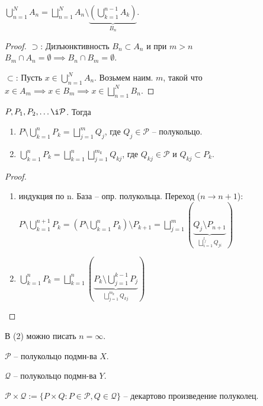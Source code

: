 \begin{lemma}
    $\bigcup_{n=1}^{N} A_n = \bigsqcup_{n=1}^{N}A_n \setminus \underbrace{\left(\bigcup_{k=1}^{n-1}A_k\right)}_{B_n}$.
\end{lemma}
\begin{proof}
    $\supset$: Дизъюнктивность $B_n \subset A_n $ и при $m > n$ $B_m \cap A_n = \emptyset \implies B_n \cap B_m = \emptyset$.
    
    $\subset$: Пусть $x \in \bigcup_{n=1}^{N} A_n$. Возьмем наим. $m$, такой что $x \in A_m \implies x \in B_m \implies x \in \bigsqcup_{n=1}^{N} B_n$.
\end{proof}

\begin{theorem}
    $P, P_1, P_2, \dots \i \mathcal{P}$. Тогда 

    \begin{enumerate}
        \item $P \setminus \bigcup_{k=1}^{n} P_k = \bigsqcup_{j=1}^m Q_j$, где $Q_j \in \mathcal{P}$ -- полукольцо.
        \item $\bigcup_{k=1}^{n} P_k = \bigsqcup_{k=1}^{n} \bigsqcup_{j=1}^{m_k} Q_{kj}$, где $Q_{kj} \in \mathcal{P}$ и $Q_{kj} \subset P_k$. 
    \end{enumerate}
\end{theorem}

\begin{proof}
    \begin{enumerate}
        \item индукция по n. База -- опр. полукольца. Переход ($n \rightarrow n+1$): $P \setminus \bigcup_{k=1}^{n+1}P_k = \left(P \setminus \bigcup_{k=1}^nP_k\right) \setminus P_{k+1} = \bigsqcup_{j=1}^{m} \left(\underbrace{Q_j \setminus P_{n+1}}_{\bigsqcup_{i=1}^{l_j}Q_{ji}}\right)$
        \item $\bigcup_{k=1}^{n} P_k = \bigsqcup_{k=1}^{n} \left(\underbrace{P_k \setminus \bigcup_{j=1}^{k-1} P_j}_{\bigsqcup_{j=1}^{m_k} Q_{kj}}\right)$
    \end{enumerate}
\end{proof}

\begin{remark}
    В (2) можно писать $n = \infty$.
\end{remark}

\begin{definition}
    $\mathcal{P}$ -- полукольцо подмн-ва $X$.

    $\mathcal{Q}$ -- полукольцо подмн-ва $Y$.

    $\mathcal{P} \times \mathcal{Q} := \{P \times Q : P \in \mathcal{P}, Q \in \mathcal{Q}\}$ -- декартово произведение полуколец.
\end{definition}

